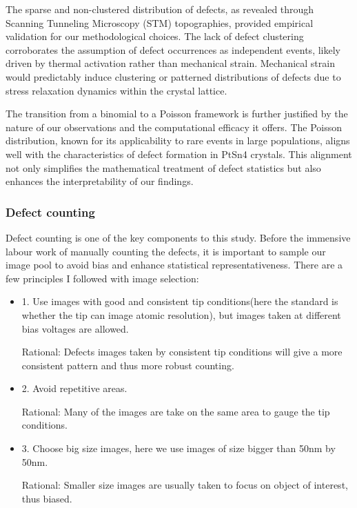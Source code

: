 \par The sparse and non-clustered distribution of defects, as revealed through Scanning Tunneling Microscopy (STM) topographies, provided empirical validation for our methodological choices. The lack of defect clustering corroborates the assumption of defect occurrences as independent events, likely driven by thermal activation rather than mechanical strain. Mechanical strain would predictably induce clustering or patterned distributions of defects due to stress relaxation dynamics within the crystal lattice.
\par The transition from a binomial to a Poisson framework is further justified by the nature of our observations and the computational efficacy it offers. The Poisson distribution, known for its applicability to rare events in large populations, aligns well with the characteristics of defect formation in PtSn4 crystals. This alignment not only simplifies the mathematical treatment of defect statistics but also enhances the interpretability of our findings.

\subsubsection{Defect counting}
Defect counting is one of the key components to this study. Before the immensive labour work of manually counting the defects, it is important to sample our image pool to avoid bias and enhance statistical representativeness. There are a few principles I followed with image selection: 
\begin{itemize}
	\item 1. Use images with good and consistent tip conditions(here the standard is whether the tip can image atomic resolution), but images taken at different bias voltages are allowed. 
	\par Rational: Defects images taken by consistent tip conditions will give a more consistent pattern and thus more robust counting.	
	\item 2. Avoid repetitive areas. 
	\par Rational: Many of the images are take on the same area to gauge the tip conditions.
	\item 3. Choose big size images, here we use images of size bigger than 50nm by 50nm.
	\par Rational: Smaller size images are usually taken to focus on object of interest, thus biased.  
\end{itemize}  

